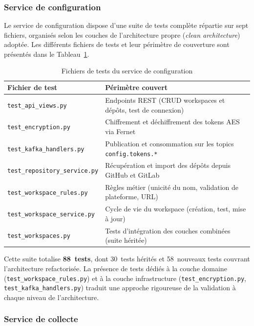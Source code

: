 \subsubsection*{Service de configuration}

Le service de configuration dispose d'une suite de tests complète répartie sur sept fichiers,
organisés selon les couches de l'architecture propre (\textit{clean architecture}) adoptée.
Les différents fichiers de tests et leur périmètre de couverture sont présentés dans le
Tableau~\ref{tab:tests-config}.

\begin{table}[H]
\centering
\small
\caption{Fichiers de tests du service de configuration}
\label{tab:tests-config}
\begin{tabular}{|>{\raggedright\arraybackslash}p{6cm}
                |>{\raggedright\arraybackslash}p{7cm}|}
\hline
\textbf{Fichier de test} & \textbf{Périmètre couvert} \\
\hline
\texttt{test\_api\_views.py} & Endpoints REST (CRUD workspaces et dépôts, test de connexion) \\
\hline
\texttt{test\_encryption.py} & Chiffrement et déchiffrement des tokens AES via Fernet \\
\hline
\texttt{test\_kafka\_handlers.py} & Publication et consommation sur les topics \texttt{config.tokens.*} \\
\hline
\texttt{test\_repository\_service.py} & Récupération et import des dépôts depuis GitHub et GitLab \\
\hline
\texttt{test\_workspace\_rules.py} & Règles métier (unicité du nom, validation de plateforme, URL) \\
\hline
\texttt{test\_workspace\_service.py} & Cycle de vie du workspace (création, test, mise à jour) \\
\hline
\texttt{test\_workspaces.py} & Tests d'intégration des couches combinées (suite héritée) \\
\hline
\end{tabular}
\end{table}

Cette suite totalise \textbf{88~tests}, dont 30~tests hérités et 58~nouveaux tests couvrant
l'architecture refactorisée. La présence de tests dédiés à la couche domaine
(\texttt{test\_workspace\_rules.py}) et à la couche infrastructure (\texttt{test\_encryption.py},
\texttt{test\_kafka\_handlers.py}) traduit une approche rigoureuse de la validation à chaque
niveau de l'architecture.

\subsubsection*{Service de collecte}

